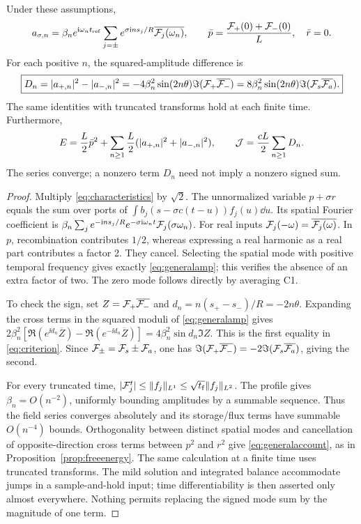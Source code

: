 \begin{theorem}\label{thm:temporal}
Under these assumptions,
\begin{equation}\label{eq:generalamp}
 a_{\sigma,n}=\beta_ne^{\mathrm i\omega_nt_{\mathrm{ref}}}
 \sum_{j=\pm}e^{\sigma\mathrm i ns_j/R}\overline{\mathcal F_j(\omega_n)},\qquad
 \bar p=\frac{\mathcal F_+(0)+\mathcal F_-(0)}L,\quad\bar r=0.
\end{equation}
For each positive $n$, the squared-amplitude difference is
\begin{equation}\label{eq:criterion}
 \boxed{D_n=|a_{+,n}|^2-|a_{-,n}|^2
 =-4\beta_n^2\sin(2n\theta)\Im(\mathcal F_+\overline{\mathcal F_-})
 =8\beta_n^2\sin(2n\theta)\Im(\mathcal F_s\overline{\mathcal F_a}).}
\end{equation}
The same identities with truncated transforms hold at each finite time. Furthermore,
\begin{equation}\label{eq:generalaccount}
 E=\frac L2\bar p^2+\sum_{n\ge1}\frac L2(|a_{+,n}|^2+|a_{-,n}|^2),\qquad
 \mathcal J=\frac{cL}2\sum_{n\ge1}D_n.
\end{equation}
The series converge; a nonzero term $D_n$ need not imply a nonzero signed sum.
\end{theorem}
\begin{proof}
Multiply \eqref{eq:characteristics} by $\sqrt2$. The unnormalized variable $p+\sigma r$ equals the sum over ports of $\int b_j(s-\sigma c(t-u))f_j(u)\dd u$. Its spatial Fourier coefficient is
$\beta_n\sum_j e^{-\mathrm i ns_j/R}e^{-\sigma\mathrm i\omega_nt}\mathcal F_j(\sigma\omega_n)$.
For real inputs $\mathcal F_j(-\omega)=\overline{\mathcal F_j(\omega)}$. In $p$, recombination contributes $1/2$, whereas expressing a real harmonic as a real part contributes a factor 2. They cancel. Selecting the spatial mode with positive temporal frequency gives exactly \eqref{eq:generalamp}; this verifies the absence of an extra factor of two. The zero mode follows directly by averaging C1.

To check the sign, set $Z=\mathcal F_+\overline{\mathcal F_-}$ and $d_n=n(s_+-s_-)/R=-2n\theta$. Expanding the cross terms in the squared moduli of \eqref{eq:generalamp} gives
$2\beta_n^2[\Re(e^{\ii d_n}\overline Z)-\Re(e^{-\ii d_n}\overline Z)]
=4\beta_n^2\sin d_n\Im Z$.
This is the first equality in \eqref{eq:criterion}. Since $\mathcal F_\pm=\mathcal F_s\pm\mathcal F_a$, one has $\Im(\mathcal F_+\overline{\mathcal F_-})=-2\Im(\mathcal F_s\overline{\mathcal F_a})$, giving the second.

For every truncated time, $|\mathcal F_j^t|\le\lVert f_j\rVert_{L^1}\le\sqrt{t_{\mathrm f}}\lVert f_j\rVert_{L^2}$. The profile gives $\beta_n=O(n^{-2})$, uniformly bounding amplitudes by a summable sequence. Thus the field series converges absolutely and its storage/flux terms have summable $O(n^{-4})$ bounds. Orthogonality between distinct spatial modes and cancellation of opposite-direction cross terms between $p^2$ and $r^2$ give \eqref{eq:generalaccount}, as in Proposition~\ref{prop:freeenergy}. The same calculation at a finite time uses truncated transforms. The mild solution and integrated balance accommodate jumps in a sample-and-hold input; time differentiability is then asserted only almost everywhere. Nothing permits replacing the signed mode sum by the magnitude of one term.
\end{proof}

